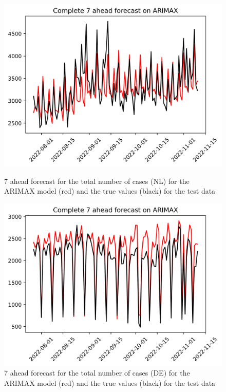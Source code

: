 \begin{figure}

\begin{minipage}{.32\textwidth}
  \centering
  \includegraphics[width=\linewidth]{pics/7_ah/Complete_7_ahead_ARIMAX.png}
  \caption{7 ahead forecast for the total number of cases (NL) for the ARIMAX model (red) and the true values (black) for the test data}
  \label{fig:tot_cases_fc_7_ARIMAX}
\end{minipage}
\begin{minipage}{.32\textwidth}
  \centering
  \includegraphics[width=\linewidth]{pics/7_ah/DE_Complete_7_ahead_ARIMAX.png}
  \caption{7 ahead forecast for the total number of cases (DE) for the ARIMAX model (red) and the true values (black) for the test data}

\end{minipage}
\end{figure}
